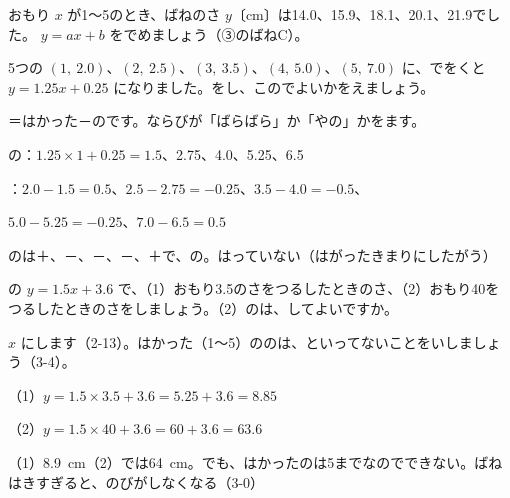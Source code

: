 \begin{jibun}
おもり $x$ が1〜5のとき、ばねのさ $y$〔cm〕は14.0、15.9、18.1、20.1、21.9でした。 $y=ax+b$ をでめましょう（③のばねC）。
\end{jibun}

\begin{reidai}
5つの $(1,\ 2.0)$、$(2,\ 2.5)$、$(3,\ 3.5)$、$(4,\ 5.0)$、$(5,\ 7.0)$ に、でをくと $y=1.25x+0.25$ になりました。をし、このでよいかをえましょう。\par
\kangaekata {}＝はかった－のです。ならびが「ばらばら」か「やの」かをます。\par
\shiki {}の：$1.25\times1+0.25=1.5$、2.75、4.0、5.25、6.5\par
\hspace*{2.6\zw}：$2.0-1.5=0.5$、$2.5-2.75=-0.25$、$3.5-4.0=-0.5$、\par
\hspace*{2.6\zw}$5.0-5.25=-0.25$、$7.0-6.5=0.5$\par
\kotae {}のは＋、－、－、－、＋で、の。はっていない（はがったきまりにしたがう）
\end{reidai}

\begin{reidai}[\R{直線}{ちょく|せん}で\R{予想}{よ|そう}する]
の $y=1.5x+3.6$ で、（1）おもり3.5のさをつるしたときのさ、（2）おもり40をつるしたときのさをしましょう。（2）のは、してよいですか。\par
\kangaekata $x$ にします（2-13）。はかった（1〜5）ののは、といってないことをいしましょう（3-4）。\par
\shiki（1）\nobreak $y=1.5\times3.5+3.6=5.25+3.6=8.85$\par
\hspace*{2.6\zw}（2）\nobreak $y=1.5\times40+3.6=60+3.6=63.6$\par
\kotae（1）\nobreak {}\qty{8.9}{cm}\quad（2）\nobreak {}では\qty{64}{cm}。でも、はかったのは5までなのでできない。ばねはきすぎると、のびがしなくなる（3-0）
\end{reidai}

